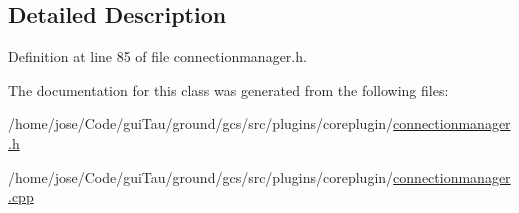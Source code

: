 \subsection{Detailed Description}


Definition at line 85 of file connectionmanager.\-h.



The documentation for this class was generated from the following files\-:\begin{DoxyCompactItemize}
\item 
/home/jose/\-Code/gui\-Tau/ground/gcs/src/plugins/coreplugin/\hyperlink{connectionmanager_8h}{connectionmanager.\-h}\item 
/home/jose/\-Code/gui\-Tau/ground/gcs/src/plugins/coreplugin/\hyperlink{connectionmanager_8cpp}{connectionmanager.\-cpp}\end{DoxyCompactItemize}
